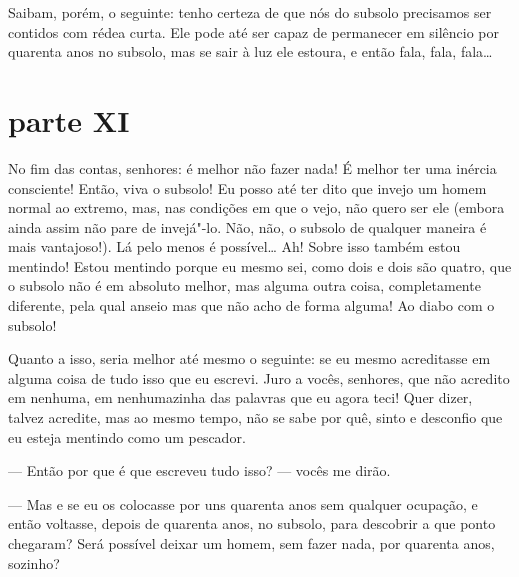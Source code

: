 Saibam, porém, o seguinte: tenho certeza de que nós do subsolo
precisamos ser contidos com rédea curta. Ele pode até ser capaz de
permanecer em silêncio por quarenta anos no subsolo, mas se sair à luz
ele estoura, e então fala, fala, fala\ldots{}


\section{parte XI}

No fim das contas, senhores: é melhor não fazer nada! É melhor ter uma
inércia consciente! Então, viva o subsolo! Eu posso até ter dito que
invejo um homem normal ao extremo, mas, nas condições em que o vejo,
não quero ser ele (embora ainda assim não pare de invejá"-lo. Não, não,
o subsolo de qualquer maneira é mais vantajoso!). Lá pelo menos é
possível\ldots{} Ah! Sobre isso também estou mentindo! Estou mentindo porque
eu mesmo sei, como dois e dois são quatro, que o subsolo não é em
absoluto melhor, mas alguma outra coisa, completamente diferente, pela
qual anseio mas que não acho de forma alguma! Ao diabo com o subsolo!

Quanto a isso, seria melhor até mesmo o seguinte: se eu mesmo
acreditasse em alguma coisa de tudo isso que eu escrevi. Juro a vocês,
senhores, que não acredito em nenhuma, em nenhumazinha das palavras que
eu agora teci! Quer dizer, talvez acredite, mas ao mesmo tempo, não se
sabe por quê, sinto e desconfio que eu esteja mentindo como um
pescador.

--- Então por que é que escreveu tudo isso? --- vocês me dirão.

--- Mas e se eu os colocasse por uns quarenta anos sem qualquer ocupação,
e então voltasse, depois de quarenta anos, no subsolo, para descobrir a
que ponto chegaram? Será possível deixar um homem, sem fazer nada, por
quarenta anos, sozinho?

